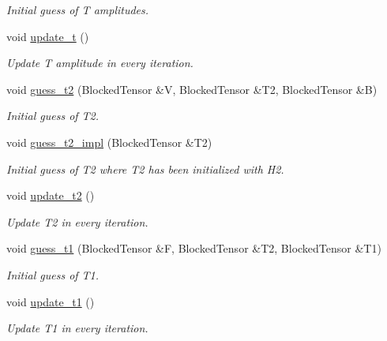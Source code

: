 \begin{DoxyCompactItemize}
\begin{DoxyCompactList}\small\item\em Initial guess of T amplitudes. \end{DoxyCompactList}\item 
void \mbox{\hyperlink{classforte_1_1_s_a___m_r_d_s_r_g_aff5d8d7d3cd3de55f686a2815179ea90}{update\+\_\+t}} ()
\begin{DoxyCompactList}\small\item\em Update T amplitude in every iteration. \end{DoxyCompactList}\item 
void \mbox{\hyperlink{classforte_1_1_s_a___m_r_d_s_r_g_aa06609443262686d26c68c367d8596eb}{guess\+\_\+t2}} (Blocked\+Tensor \&V, Blocked\+Tensor \&T2, Blocked\+Tensor \&B)
\begin{DoxyCompactList}\small\item\em Initial guess of T2. \end{DoxyCompactList}\item 
void \mbox{\hyperlink{classforte_1_1_s_a___m_r_d_s_r_g_aa622efcba6577bc09c258fd34f0711f9}{guess\+\_\+t2\+\_\+impl}} (Blocked\+Tensor \&T2)
\begin{DoxyCompactList}\small\item\em Initial guess of T2 where T2 has been initialized with H2. \end{DoxyCompactList}\item 
void \mbox{\hyperlink{classforte_1_1_s_a___m_r_d_s_r_g_ae2f0d959eec8e5b74a1610e30541a3e6}{update\+\_\+t2}} ()
\begin{DoxyCompactList}\small\item\em Update T2 in every iteration. \end{DoxyCompactList}\item 
void \mbox{\hyperlink{classforte_1_1_s_a___m_r_d_s_r_g_ae32281c336983e306e06cd66f9428d58}{guess\+\_\+t1}} (Blocked\+Tensor \&F, Blocked\+Tensor \&T2, Blocked\+Tensor \&T1)
\begin{DoxyCompactList}\small\item\em Initial guess of T1. \end{DoxyCompactList}\item 
void \mbox{\hyperlink{classforte_1_1_s_a___m_r_d_s_r_g_a2b1966aa6b570e4d7a4c37970ea71da4}{update\+\_\+t1}} ()
\begin{DoxyCompactList}\small\item\em Update T1 in every iteration. \end{DoxyCompactList}\item 

\end{DoxyCompactItemize}
